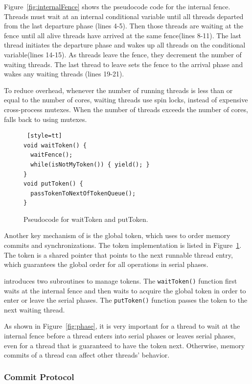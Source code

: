 Figure~\ref{fig:internalFence} shows the pseudocode code for the internal fence. Threads must wait at an internal conditional variable until all threads departed from the last departure phase (lines 4-5). Then those threads are waiting at the fence until all alive threads have arrived at the same fence(lines 8-11). The last thread initiates the departure phase and wakes up all threads on the conditional variable(lines 14-15). As threads leave the fence, they decrement the number of waiting threads.  The last thread to leave sets the fence to the arrival phase and wakes any waiting threads (lines 19-21).

To reduce overhead, whenever the number of running threads is less than or equal to the number of cores, waiting threads use spin locks, instead of expensive cross-process \pthreads{} mutexes. When the number of threads exceeds the number of cores, \dthreads{} falls back to using \pthreads{} mutexes.

\begin{figure}
\begin{lstlisting} [style=tt]
void waitToken() {
  waitFence();
  while(isNotMyToken()) { yield(); }
}
void putToken() {
  passTokenToNextOfTokenQueue();
}
\end{lstlisting}
\caption{Pseudocode for waitToken and putToken. 
\label{fig:token}}
\end{figure}

Another key mechanism of \dthreads{} is the global token, which \dthreads{} uses to order memory commits and synchronizations. The token implementation is listed in Figure~\ref{fig:token}. The token is a shared pointer that points to the next runnable thread entry, which guarantees the global order for all operations in serial phases.  

\dthreads{} introduces two subroutines to manage tokens.  The \texttt{waitToken()} function first waits at the internal fence and then waits to acquire the global token in order to enter or leave the serial phases. The \texttt{putToken()} function passes the token to the next waiting thread. 

As shown in Figure~\ref{fig:phase}, it is very important for a thread to wait at the internal fence before a thread enters into serial phases or leaves serial phases, even for a thread that is guaranteed to have the token next. Otherwise, memory commits of a thread can affect other threads' behavior. 

\subsubsection{Commit Protocol}

